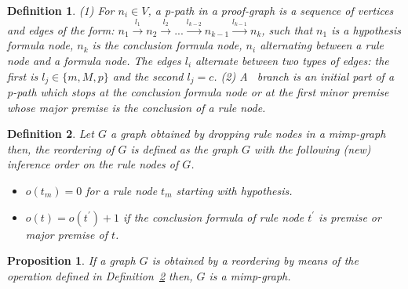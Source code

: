 \documentclass[submission,copyright,creativecommons]{eptcs}
\newtheorem{definition}{Definition}
\newtheorem{proposition}{Proposition}
\begin{document}
\begin{definition}
\label{defbranch} (1) For $n_i \in V$, a \emph{p-path} in a proof-graph is a
sequence of vertices and edges of the form: $n_1 \xrightarrow{l_1} n_2 \xrightarrow{l_2}... \xrightarrow{l_{k-2}} n_{k-1} \xrightarrow{l_{k-1}}
n_{k}$, such that $n_1$ is a hypothesis formula node, $n_k$ is the
conclusion formula node, $n_i$ alternating between a rule node and a formula
node. The edges $l_i$ alternate between two types of edges: the first is $l_j \in \{m, M, p\}$ and the second $l_j=c$. (2) A \emph{\ branch} is an
initial part of a \emph{p-path} which stops at the conclusion formula node
or at the first minor premise whose major premise is the conclusion of a
rule node.
\end{definition}

\begin{definition}
\label{defReorder} Let $G$ a graph obtained by dropping rule nodes in a
mimp-graph then, the reordering of $G$ is defined as the graph $G$ with the
following (new) inference order on the rule nodes of $G$.



\begin{itemize}
\item  $o(t_m) = 0$ for a rule node $t_m$ starting with hypothesis.

\item  $o(t) = o(t^{\prime}) + 1$ if the conclusion formula of rule node $t^{\prime}$ is premise or major premise of $t$.
\end{itemize}
\end{definition}

\begin{proposition}
\label{prop} If a graph $G$ is obtained by a reordering by means of the
operation defined in Definition~\ref{defReorder} then, $G$ is a mimp-graph.
\end{proposition}
\end{document}
